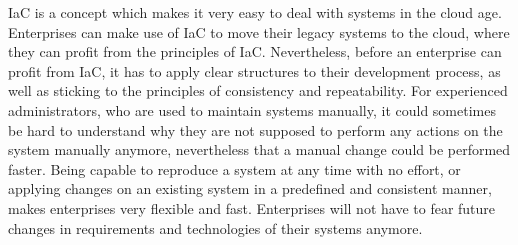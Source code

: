 IaC is a concept which makes it very easy to deal with systems in the cloud age. Enterprises can make use of IaC to move their legacy systems to the cloud, where they can profit from the principles of IaC. Nevertheless, before an enterprise can profit from IaC, it has to apply clear structures to their development process, as well as sticking to the principles of consistency and repeatability. For experienced administrators, who are used to maintain systems manually, it could sometimes be hard to understand why they are not supposed to perform any actions on the system manually anymore, nevertheless that a manual change could be performed faster. Being capable to reproduce a system at any time with no effort,  or applying changes on an existing system in a predefined and consistent manner,  makes enterprises very flexible and fast. Enterprises will not have to fear future changes in requirements and technologies of their systems anymore.    




